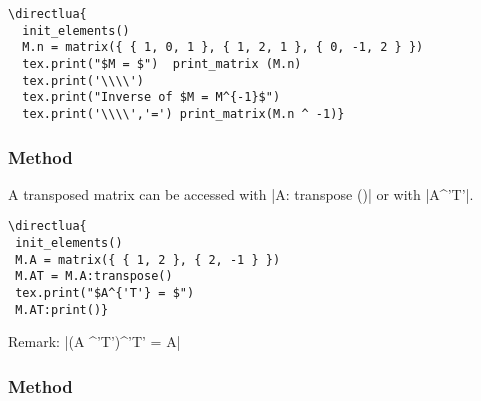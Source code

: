 \begin{minipage}{.6\textwidth}
\begin{verbatim}
\directlua{
  init_elements()
  M.n = matrix({ { 1, 0, 1 }, { 1, 2, 1 }, { 0, -1, 2 } })
  tex.print("$M = $")  print_matrix (M.n)
  tex.print('\\\\')
  tex.print("Inverse of $M = M^{-1}$")
  tex.print('\\\\','=') print_matrix(M.n ^ -1)}
\end{verbatim}
\end{minipage}
\begin{minipage}{.4\textwidth}
\end{minipage}


\subsubsection{Method  } %
\label{ssub:transpose_matrix}

A transposed matrix can be accessed with |A: transpose ()| or with |A^{'T'}|.

\vspace{.5em}
\begin{minipage}{.6\textwidth}
\begin{verbatim}
\directlua{
 init_elements()
 M.A = matrix({ { 1, 2 }, { 2, -1 } })
 M.AT = M.A:transpose()
 tex.print("$A^{'T'} = $")
 M.AT:print()}
\end{verbatim}
\end{minipage}
\begin{minipage}{.4\textwidth}
\end{minipage}

\vspace{.5em}
Remark: |(A ^'T')^'T' = A|


\subsubsection{Method } %
\label{ssub:method_adjugate}

